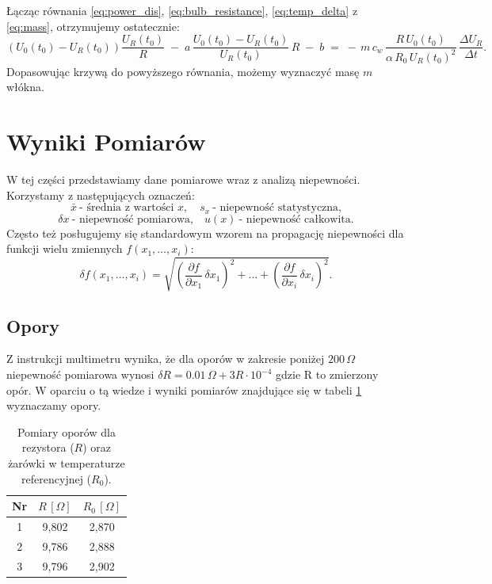 \documentclass[12pt]{article}
\begin{document}
Łącząc równania \eqref{eq:power_dis}, \eqref{eq:bulb_resistance}, \eqref{eq:temp_delta} z \eqref{eq:mass}, otrzymujemy ostatecznie:
\begin{equation}
    (U_0(t_0) - U_R(t_0))\frac{U_R(t_0)}{R}
    \;-\;
    a\,\frac{U_0(t_0) - U_R(t_0)}{U_R(t_0)}\,R
    \;-\; b
    \;=\;
    -\,m\,c_w\,\frac{R\,U_0(t_0)}{\alpha\,R_0\,U_R(t_0)^2}\,\frac{\Delta U_R}{\Delta t}.
    \label{eq:final}
\end{equation}
Dopasowując krzywą do powyższego równania, możemy wyznaczyć masę $m$ włókna.

\section{Wyniki Pomiarów}
W tej części przedstawiamy dane pomiarowe wraz z analizą niepewności.  
Korzystamy z następujących oznaczeń:  
\[
    \bar{x} \ \text{- średnia z wartości }x,\quad s_x \ \text{- niepewność statystyczna,}
\]
\[
    \delta x \ \text{- niepewność pomiarowa,}\quad u(x) \ \text{- niepewność całkowita.}
\]
Często też posługujemy się standardowym wzorem na propagację niepewności dla funkcji wielu zmiennych $f(x_1,\ldots,x_i)$:
\begin{equation}
    \delta f(x_1,\ldots,x_i)
    = \sqrt{\left(\frac{\partial f}{\partial x_1}\,\delta x_1\right)^2 + \dots + \left(\frac{\partial f}{\partial x_i}\,\delta x_i\right)^2}.
    \label{eq:error_propagation}
\end{equation}

\subsection{Opory}
Z instrukcji multimetru \cite{multimeter} wynika, że dla oporów w zakresie poniżej $200\,\Omega$ niepewność pomiarowa wynosi $\delta R =0.01\,\Omega + 3R\cdot10^{-4}$ gdzie R to zmierzony opór.
W oparciu o tą wiedze i wyniki pomiarów znajdujące się w tabeli \ref{tab:opory} wyznaczamy opory.
\begin{table}[H]
    \centering
    \begin{tabular}{c|cc}
        \toprule
        \textbf{Nr} & $R \, [\Omega]$ & $R_0 \, [\Omega]$ \\
        \midrule
        1 & 9{,}802  & 2{,}870 \\
        2 & 9{,}786  & 2{,}888 \\
        3 & 9{,}796  & 2{,}902 \\
        \bottomrule
    \end{tabular}
    \caption{Pomiary oporów dla rezystora ($R$) oraz żarówki w temperaturze referencyjnej ($R_0$).}
    \label{tab:opory}
\end{table}
\end{document}
